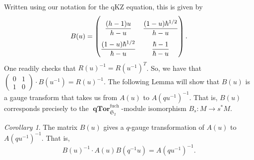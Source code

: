 \documentclass[a4paper]{report}
\theoremstyle{theorem}
\theoremstyle{definition}
\theoremstyle{remark}
\theoremstyle{proposition}
\theoremstyle{conjecture}
\theoremstyle{lemma}
\theoremstyle{corollary}
\newtheorem{corollary}{Corollary}
\theoremstyle{exercise}
\theoremstyle{example}
\newcommand{\on}{\operatorname}
\newcommand{\qTor}{\on{\mathbf{qTor}}}
\begin{document}
  Written using our notation for the qKZ equation, this is given by 
  $$B(u) = \renewcommand\arraystretch{2.5}\begin{pmatrix}
      \displaystyle\frac{(h-1)u}{h-u}  & \displaystyle\frac{(1-u)\hbar^{1/2}}{h-u}\\
      \displaystyle\frac{(1-u)\hbar^{1/2}}{\hbar - u} & \displaystyle\frac{\hbar - 1}{\hbar - u}
  \end{pmatrix}.$$
  One readily checks that $R(u)^{-1} = R(u^{-1})^T$. So, we have that $\begin{pmatrix}
      0 & 1\\
      1 & 0
  \end{pmatrix}\cdot B(u^{-1}) = R(u)^{-1}$. The following Lemma will show that 
  $B(u)$ is a gauge transform that takes us from $A(u)$ to $A(qu^{-1})^{-1}$. 
  That is, $B(u)$ corresponds precisely to the $\qTor_{\mathfrak{S}_2}^{\on{fuch}}$-module
  isomorphism $B_s : M \to s^\ast M$.
  \begin{corollary}\label{cor_B_gauge}
      The matrix $B(u)$ gives a $q$-gauge transformation of $A(u)$ to $A(qu^{-1})^{-1}$. That is, 
      $$B(u)^{-1} \cdot A(u) B(q^{-1}u) = A(qu^{-1})^{-1}.$$
  \end{corollary}
\end{document}
